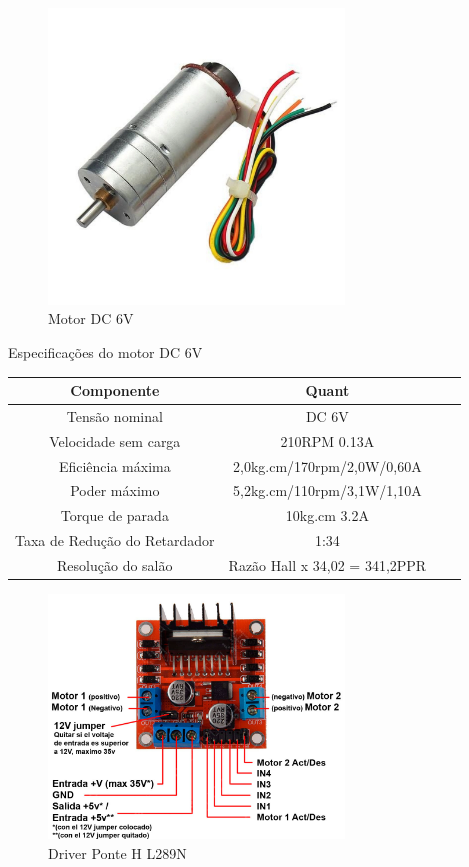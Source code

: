 \begin{figure}[h]
	\centering
	\includegraphics[width=0.7\textwidth]{figures/CHR_GM25_370}
	\caption{Motor DC 6V \cite{motor_dc_6v_encoder}}
\end{figure}


\begin{quadro}[htb]
	\caption{\label{Especificacoes_motordc_6v}Especificações do motor DC 6V}
	 \begin{tabular}{|c|c|c|c|}
		\hline
		\textbf{Componente} & \textbf{Quant} \\ \hline
		Tensão nominal & DC 6V  \\ \hline
		Velocidade sem carga  & 210RPM 0.13A  \\ \hline
		Eficiência máxima & 2,0kg.cm/170rpm/2,0W/0,60A   \\ \hline
		Poder máximo & 5,2kg.cm/110rpm/3,1W/1,10A   \\ \hline
		Torque de parada  & 10kg.cm 3.2A    \\ \hline
		Taxa de Redução do Retardador & 1:34  \\ \hline
		Resolução do salão & Razão Hall x 34,02 = 341,2PPR  \\ \hline
	\end{tabular}
	\end{quadro}

\begin{figure}[h]
	\centering
	\includegraphics[width=0.7\textwidth]{figures/l289n}
	\caption{Driver Ponte H L289N \cite{l289n}}
\end{figure}

